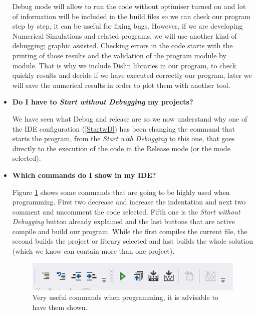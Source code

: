 \begin{itemize}
    Debug mode will allow to run the code without optimiser turned on and lot of information will be included in the build files so we can check our program step by step, it can be useful for fixing bugs. However, if we are developing Numerical Simulations and related programs, we will use another kind of debugging; graphic assisted. Checking errors in the code starts with the printing of those results and the validation of the program module by module. That is why we include Dislin libraries in our program, to check quickly results and decide if we have executed correctly our program, later we will save the numerical results in order to plot them with another tool. 
    
    \item \textbf{Do I have to \textit{Start without Debugging} my projects?} 
    
    We have seen what Debug and release are so we now understand why one of the IDE configuration (\ref{StartwD}) has been changing the command that starts the program, from the \textit{Start with Debugging} to this one, that goes directly to the execution of the code in the Release mode (or the mode selected).
    
    \item \textbf{Which commands do I show in my IDE?} 
    
    Figure \ref{fig:Commands} shows some commands that are going to be highly used when programming. First two decrease and increase the indentation and next two comment and uncomment the code selected. Fifth one is the \textit{Start without Debugging} button already explained and the last buttons that are active compile and build our program. While the first compiles the current file, the second builds the project or library selected and last builds the whole solution (which we know can contain more than one project).
    
    \begin{figure}[h]
        \centering
        \includegraphics[width= 0.9 \textwidth]{Figures/Commands}
        \caption{Very useful commands when programming, it is advisable to have them shown.}
        \label{fig:Commands}
    \end{figure}
    

\end{itemize}
